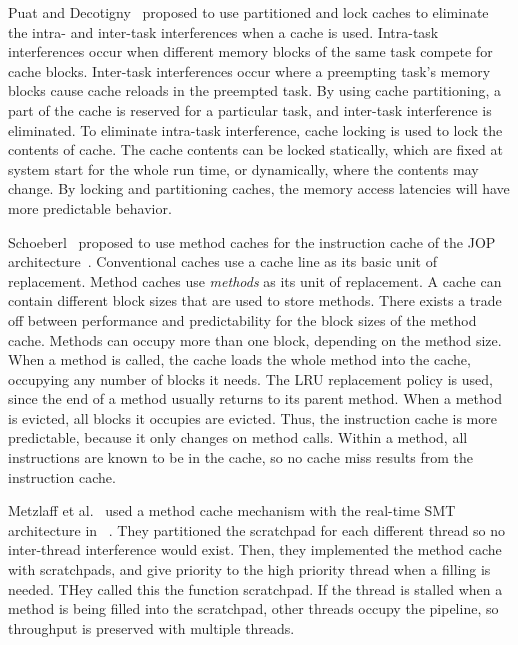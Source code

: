 Puat and Decotigny~\cite{Puaut02} proposed to use partitioned and lock caches to eliminate the intra- and inter-task interferences when a cache is used. 
Intra-task interferences occur when different memory blocks of the same task compete for cache blocks.
Inter-task interferences occur where a preempting task's memory blocks cause cache reloads in the preempted task.
By using cache partitioning, a part of the cache is reserved for a particular task, and inter-task interference is eliminated.
To eliminate intra-task interference, cache locking is used to lock the contents of cache.
The cache contents can be locked statically, which are fixed at system start for the whole run time, or dynamically, where the contents may change.   
By locking and partitioning caches, the memory access latencies will have more predictable behavior. 

Schoeberl~\cite{jop:jtres_cache} proposed to use method caches for the instruction cache of the JOP architecture~\cite{jop:wcet}.
Conventional caches use a cache line as its basic unit of replacement. 
Method caches use \emph{methods} as its unit of replacement. 
A cache can contain different block sizes that are used to store methods. 
There exists a trade off between performance and predictability for the block sizes of the method cache. 
Methods can occupy more than one block, depending on the method size. 
When a method is called, the cache loads the whole method into the cache, occupying any number of blocks it needs.
The LRU replacement policy is used, since the end of a method usually returns to its parent method. 
When a method is evicted, all blocks it occupies are evicted. 
Thus, the instruction cache is more predictable, because it only changes on method calls. 
Within a method, all instructions are known to be in the cache, so no cache miss results from the instruction cache.
 
Metzlaff et al.~\cite{Metzlaff2008MethodcacheSMIT} used a method cache mechanism with the real-time SMT architecture in ~\cite{Mische2008SMT}.
They partitioned the scratchpad for each different thread so no inter-thread interference would exist.   
Then, they implemented the method cache~\cite{Kirner2007ModelFunctionCache} with scratchpads, and give priority to the high priority thread when a filling is needed.
THey called this the function scratchpad.  
If the thread is stalled when a method is being filled into the scratchpad, other threads occupy the pipeline, so throughput is preserved with multiple threads. 

